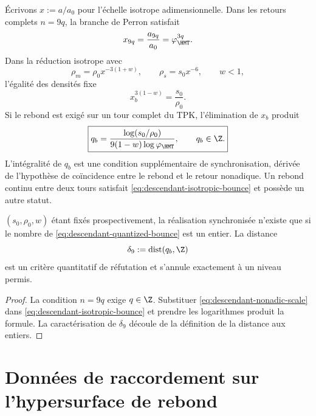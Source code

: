 Écrivons \(x:=a/a_0\) pour l'échelle isotrope adimensionnelle. Dans les
retours complets \(n=9q\), la branche de Perron satisfait
\begin{equation}
 x_{9q}=\frac{a_{9q}}{a_0}=\varphi_{\HMT}^{3q}.
 \label{eq:descendant-nonadic-scale}
\end{equation}
Dans la réduction isotrope avec
\begin{equation}
 \rho_m=\rho_0x^{-3(1+w)},
 \qquad
 \rho_s=s_0x^{-6},
 \qquad
 w<1,
 \label{eq:descendant-isotropic-densities}
\end{equation}
l'égalité des densités fixe
\begin{equation}
 x_b^{3(1-w)}=\frac{s_0}{\rho_0}.
 \label{eq:descendant-isotropic-bounce}
\end{equation}
Si le rebond est exigé sur un tour complet du TPK, l'élimination de
\(x_b\) produit
\begin{equation}
 \boxed{
 q_b=
 \frac{\log(s_0/\rho_0)}
 {9(1-w)\log\varphi_{\HMT}},
 \qquad
 q_b\in\Z.}
 \label{eq:descendant-quantized-bounce}
\end{equation}
L'intégralité de \(q_b\) est une condition supplémentaire de synchronisation,
dérivée de l'hypothèse de coïncidence entre le rebond et le retour
nonadique. Un rebond continu entre deux tours satisfait
\cref{eq:descendant-isotropic-bounce} et possède un autre statut.

\begin{proposition}
\label{prop:descendant-quantization-falsifier}
\((s_0,\rho_0,w)\) étant fixés prospectivement, la réalisation synchronisée
n'existe que si le nombre de
\cref{eq:descendant-quantized-bounce} est un entier. La distance
\begin{equation}
 \delta_9:=\operatorname{dist}(q_b,\Z)
 \label{eq:descendant-quantization-defect}
\end{equation}
est un critère quantitatif de réfutation et s'annule exactement à un niveau permis.
\end{proposition}

\begin{proof}
La condition \(n=9q\) exige \(q\in\Z\). Substituer
\cref{eq:descendant-nonadic-scale} dans
\cref{eq:descendant-isotropic-bounce} et prendre les logarithmes produit la formule.
La caractérisation de \(\delta_9\) découle de la définition de la distance aux
entiers.
\end{proof}

\section{Données de raccordement sur l'hypersurface de rebond}

